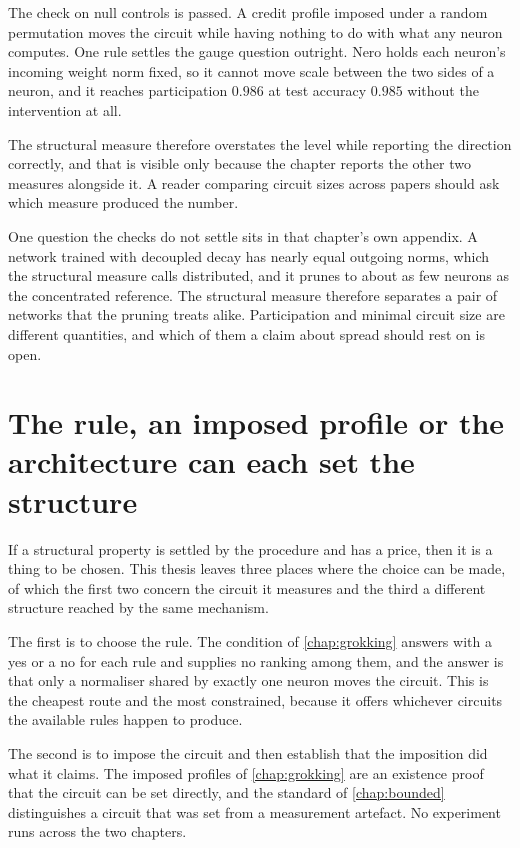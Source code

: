The check on null controls is passed. A credit profile imposed under a random
permutation moves the circuit while having nothing to do with what any neuron
computes. One rule settles the gauge question outright. Nero holds each
neuron's incoming weight norm fixed, so it cannot move scale between the two
sides of a neuron, and it reaches participation $0.986$ at test accuracy
$0.985$ without the intervention at all.

The structural measure therefore overstates the level while reporting the
direction correctly, and that is visible only because the chapter reports the
other two measures alongside it. A reader comparing circuit sizes across papers should ask which
measure produced the number.

One question the checks do not settle sits in that chapter's own appendix. A
network trained with decoupled decay has nearly equal outgoing norms, which
the structural measure calls distributed, and it prunes to about as few
neurons as the concentrated reference. The structural measure therefore
separates a pair of networks that the pruning treats alike. Participation and
minimal circuit size are different
quantities, and which of them a claim about spread should rest on is open.

\section{The rule, an imposed profile or the architecture can each set the structure}
\label{sec:disc_design}

If a structural property is settled by the procedure and has a price, then it
is a thing to be chosen. This thesis leaves three places where the choice can
be made, of which the first two concern the circuit it measures and the third
a different structure reached by the same mechanism.

The first is to choose the rule. The condition of \cref{chap:grokking} answers
with a yes or a no for each rule and supplies no ranking among them, and the
answer is that only a normaliser shared by exactly one neuron moves the
circuit. This is the cheapest route and the most constrained, because it
offers whichever circuits the available rules happen to produce.

The second is to impose the circuit and then establish that the imposition did
what it claims. The imposed profiles of \cref{chap:grokking} are an existence
proof that the circuit can be set directly, and the standard of
\cref{chap:bounded} distinguishes a circuit that was set from a measurement
artefact. No experiment runs across the two chapters.

